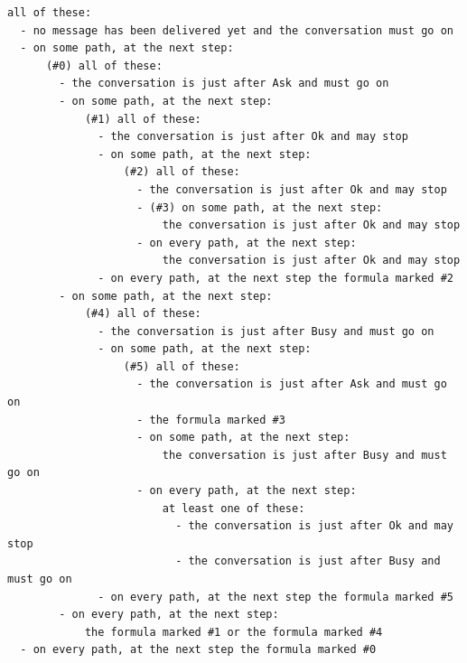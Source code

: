 \begin{lstlisting}[language={},basicstyle=\ttfamily\footnotesize,breaklines=true]
all of these:
  - no message has been delivered yet and the conversation must go on
  - on some path, at the next step:
      (#0) all of these:
        - the conversation is just after Ask and must go on
        - on some path, at the next step:
            (#1) all of these:
              - the conversation is just after Ok and may stop
              - on some path, at the next step:
                  (#2) all of these:
                    - the conversation is just after Ok and may stop
                    - (#3) on some path, at the next step:
                        the conversation is just after Ok and may stop
                    - on every path, at the next step:
                        the conversation is just after Ok and may stop
              - on every path, at the next step the formula marked #2
        - on some path, at the next step:
            (#4) all of these:
              - the conversation is just after Busy and must go on
              - on some path, at the next step:
                  (#5) all of these:
                    - the conversation is just after Ask and must go on
                    - the formula marked #3
                    - on some path, at the next step:
                        the conversation is just after Busy and must go on
                    - on every path, at the next step:
                        at least one of these:
                          - the conversation is just after Ok and may stop
                          - the conversation is just after Busy and must go on
              - on every path, at the next step the formula marked #5
        - on every path, at the next step:
            the formula marked #1 or the formula marked #4
  - on every path, at the next step the formula marked #0
\end{lstlisting}
